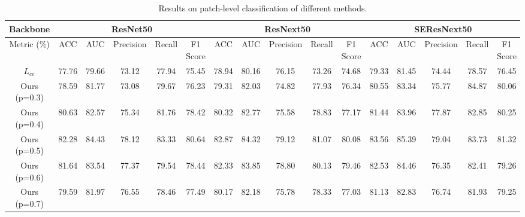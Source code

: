 
\begin{table*}[ht]
    \setlength\tabcolsep{5pt}
    \centering
    \caption{Results on patch-level classification of different methods. }
    
        \begin{tabular}{|c|c|c|c|c|c|c|c|c|c|c|c|c|c|c|c|}
        \hline
        
        Backbone& \multicolumn{5}{|c|}{ResNet50} & \multicolumn{5}{|c|}{ResNext50}& \multicolumn{5}{|c|}{SEResNext50}\\
        \hline
            Metric ($\%$)    & ACC&AUC &Precision&Recall&F1 Score&  ACC&AUC &Precision&Recall&F1 Score& ACC&AUC &Precision&Recall&F1 Score\\
        \hline
        $L_{ce}$       & 77.76 & 79.66&  73.12&77.94  &75.45&78.94 &80.16& 76.15&73.26 &74.68 & 79.33&81.45&74.44&78.57&76.45\\
        \hline
        Ours (p=0.3)       & 78.59  & 81.77 & 73.08&79.67 &76.23  &79.31& 82.03 &74.82&77.93 &76.34 &80.55 &83.34 &75.77 &84.87  &80.06\\
        \hline
        Ours (p=0.4)     & 80.63& 82.57  &75.34&81.76 & 78.42&80.32  &82.77  &75.58&78.83 & 77.17&81.44 &83.96 &77.87 &82.85  &80.25\\
        \hline
        Ours (p=0.5)     &82.28 & 84.43  &78.12&83.33 &80.64& 82.87 & 84.32  &79.12&81.07 & 80.08&83.56 &85.39 & 79.04&83.73  &81.32\\
        \hline
        Ours (p=0.6)    & 81.64& 83.54  &77.37&79.54 &78.44&82.33  &83.85  &78.80&80.13 & 79.46&82.53 &84.46 &76.35 &82.41  &79.26\\
        \hline
        Ours (p=0.7)   &79.59 & 81.97  &76.55& 78.46&77.49&80.17  &82.18  &75.78&78.33 & 77.03&81.13 &82.83 &76.74 &81.93  &79.25\\
        \hline
        
        \end{tabular}
        
        \label{tab:patch-results}
    \end{table*}
